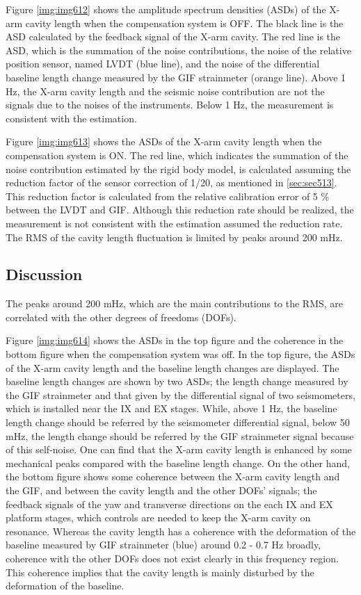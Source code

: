 Figure \ref{img:img612} shows the amplitude spectrum densities (ASDs) of the X-arm cavity length when the compensation system is OFF. The black line is the ASD calculated by the feedback signal of the X-arm cavity. The red line is the ASD, which is the summation of the noise contributions, the noise of the relative position sensor, named LVDT (blue line), and the noise of the differential baseline length change measured by the GIF strainmeter (orange line). Above 1 Hz, the X-arm cavity length and the seismic noise contribution are not the signals due to the noises of the instruments. Below 1 Hz, the measurement is consistent with the estimation.

Figure \ref{img:img613} shows the ASDs of the X-arm cavity length when the compensation system is ON. The red line, which indicates the summation of the noise contribution estimated by the rigid body model, is calculated assuming the reduction factor of the sensor correction of 1/20, as mentioned in \cref{sec:sec513}. This reduction factor is calculated from the relative calibration error of 5 \% between the LVDT and GIF. Although this reduction rate should be realized, the measurement is not consistent with the estimation assumed the reduction rate. The RMS of the cavity length fluctuation is limited by peaks around 200 mHz.

\subsection{Discussion}
The peaks around 200 mHz, which are the main contributions to the RMS, are correlated with the other degrees of freedoms (DOFs). 

Figure \ref{img:img614} shows the ASDs in the top figure and the coherence in the bottom figure when the compensation system was off. In the top figure, the ASDs of the X-arm cavity length and the baseline length changes are displayed. The baseline length changes are shown by two ASDs; the length change measured by the GIF strainmeter and that given by the differential signal of two seismometers, which is installed near the IX and EX stages. While, above 1 Hz, the baseline length change should be referred by the seismometer differential signal, below 50 mHz, the length change should be referred by the GIF strainmeter signal because of this self-noise. One can find that the X-arm cavity length is enhanced by some mechanical peaks compared with the baseline length change. On the other hand, the bottom figure shows some coherence between the X-arm cavity length and the GIF, and between the cavity length and the other DOFs' signals; the feedback signals of the yaw and transverse directions on the each IX and EX platform stages, which controls are needed to keep the X-arm cavity on resonance. Whereas the cavity length has a coherence with the deformation of the baseline measured by GIF strainmeter (blue) around 0.2 - 0.7 Hz broadly, coherence with the other DOFs does not exist clearly in this frequency region. This coherence implies that the cavity length is mainly disturbed by the deformation of the baseline.

